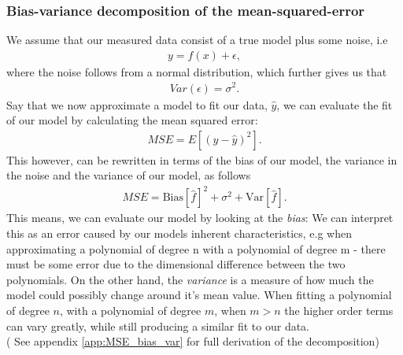 \documentclass[../main.tex]{subfiles}
\begin{document}
\subsubsection{Bias-variance decomposition of the mean-squared-error}\label{refmethod:Bias_variance_decomp}
We assume that our measured data consist of a true model plus some noise, i.e
\begin{align*}
    y = f(x) + \epsilon,
\end{align*}
where the noise follows from a normal distribution, which further gives us that 
\begin{align*}
    Var(\epsilon) = \sigma^2.
\end{align*} Say that we now approximate a model to fit our data,  $\hat y$, we can evaluate the fit of our model by calculating the mean squared error:
\begin{align*}
    MSE = E[(y-\hat y)^2].
\end{align*}
This however, can be rewritten in terms of the bias of our model, the variance in the noise and the variance of our model, as follows
\begin{align}
    MSE = \text{Bias}[\hat f]^2 + \sigma ^2 + \text{Var}[\hat f] \label{eq:bias_var_MSE}.
\end{align}
This means, we can evaluate our model by looking at the \emph{bias}: We can interpret this as an error caused by our models inherent characteristics, e.g when approximating a polynomial of degree n with a polynomial of degree m - there must be some error due to the dimensional difference between the two polynomials. \indent On the other hand, the \emph{variance} is a measure of how much the model could possibly change around it's mean value. When fitting a polynomial of degree $n$, with a polynomial of degree $m$, when $m>n$ the higher order terms can vary greatly, while still producing a similar fit to our data. \\ (
See appendix \eqref{app:MSE_bias_var} for full derivation of the decomposition)
\newpage
\end{document}
